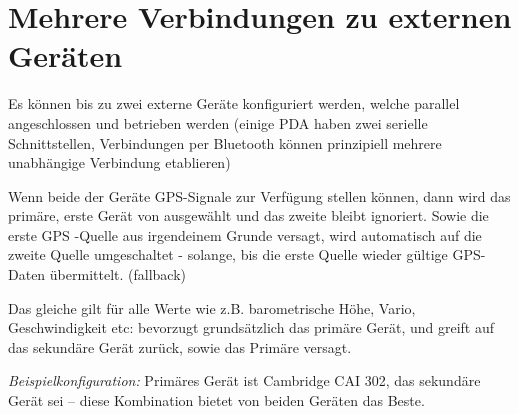 \section{Mehrere Verbindungen zu externen Geräten}

Es können bis zu zwei externe Geräte konfiguriert werden, welche parallel angeschlossen und betrieben werden (einige \textsf{PDA} haben zwei serielle Schnittstellen, Verbindungen per Bluetooth können prinzipiell mehrere unabhängige Verbindung etablieren)

Wenn  beide der Geräte GPS-Signale zur Verfügung stellen können, dann wird das primäre, erste Gerät von \xc ausgewählt und das zweite bleibt ignoriert. Sowie die erste GPS -Quelle aus irgendeinem Grunde versagt, wird automatisch auf die zweite Quelle umgeschaltet - solange, bis die erste Quelle wieder gültige GPS-Daten übermittelt. (fallback)

Das gleiche gilt für alle Werte wie z.B. barometrische Höhe, Vario, Geschwindigkeit etc:
\xc bevorzugt grundsätzlich das primäre Gerät, und greift auf das sekundäre Gerät zurück, sowie das Primäre versagt.

\textit{Beispielkonfiguration:}
Primäres Gerät ist Cambridge CAI 302, das sekundäre Gerät sei \fl -- diese Kombination bietet von beiden Geräten das Beste.
